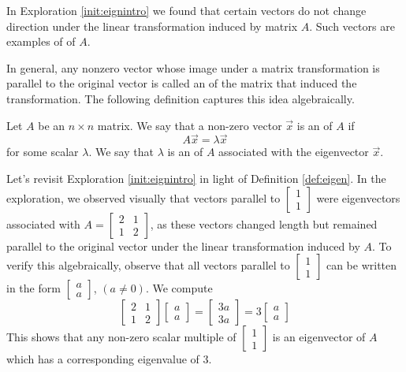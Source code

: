 \documentclass{ximera}
\begin{document}
In Exploration \ref{init:eignintro} we found that certain vectors do not change direction under the linear transformation induced by matrix $A$.  Such vectors are examples of  of $A$. 

In general, any nonzero vector whose image under a matrix transformation is parallel to the original vector is called an  of the matrix that induced the transformation.  The following definition captures this idea algebraically.

\begin{definition}\label{def:eigen}
Let $A$ be an $n \times n$ matrix.  We say that a non-zero vector $\vec{x}$ is an  of $A$ if $$A\vec{x} = \lambda \vec{x}$$
for some scalar $\lambda$.
We say that $\lambda$ is an  of $A$ associated with the eigenvector $\vec{x}$. %
\end{definition}

Let's revisit Exploration \ref{init:eignintro} in light of Definition \ref{def:eigen}.  In the exploration, we observed visually that vectors parallel to $\begin{bmatrix} 1\\ 1 \end{bmatrix}$ were eigenvectors associated with $A=\begin{bmatrix} 2& 1\\ 1&2
\end{bmatrix}$, as these vectors changed length but remained parallel to the original vector under the linear transformation induced by $A$.  To verify this algebraically, observe that all vectors parallel to $\begin{bmatrix} 1\\ 1 \end{bmatrix}$ can be written in the form $\begin{bmatrix} a\\ a \end{bmatrix}$, $(a\neq 0)$.  We compute 
$$\begin{bmatrix} 2& 1\\ 1&2 \end{bmatrix} \begin{bmatrix} a\\ a \end{bmatrix} =
\begin{bmatrix} 3a\\ 3a \end{bmatrix}= 3 \begin{bmatrix} a\\ a \end{bmatrix}$$
This shows that any non-zero scalar multiple of $\begin{bmatrix} 1\\ 1 \end{bmatrix}$ is an eigenvector of $A$ which has a corresponding eigenvalue of 3.
\end{document}
